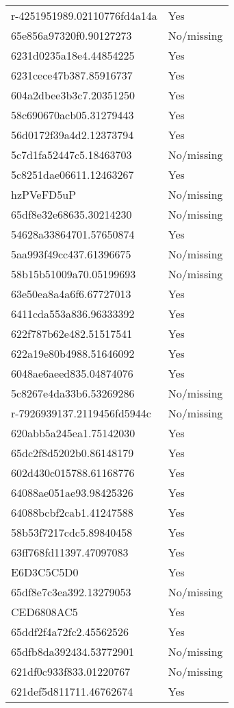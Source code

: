 \begin{tabular}{ll}
r-4251951989.02110776fd4a14a & Yes \\
65e856a97320f0.90127273 & No/missing \\
6231d0235a18e4.44854225 & Yes \\
6231cece47b387.85916737 & Yes \\
604a2dbee3b3c7.20351250 & Yes \\
58c690670acb05.31279443 & Yes \\
56d0172f39a4d2.12373794 & Yes \\
5c7d1fa52447c5.18463703 & No/missing \\
5c8251dae06611.12463267 & Yes \\
hzPVeFD5uP & No/missing \\
65df8e32e68635.30214230 & No/missing \\
54628a33864701.57650874 & Yes \\
5aa993f49cc437.61396675 & No/missing \\
58b15b51009a70.05199693 & No/missing \\
63e50ea8a4a6f6.67727013 & Yes \\
6411cda553a836.96333392 & Yes \\
622f787b62e482.51517541 & Yes \\
622a19e80b4988.51646092 & Yes \\
6048ae6aeed835.04874076 & Yes \\
5c8267e4da33b6.53269286 & No/missing \\
r-7926939137.2119456fd5944c & No/missing \\
620abb5a245ea1.75142030 & Yes \\
65dc2f8d5202b0.86148179 & Yes \\
602d430c015788.61168776 & Yes \\
64088ae051ae93.98425326 & Yes \\
64088bcbf2cab1.41247588 & Yes \\
58b53f7217cdc5.89840458 & Yes \\
63ff768fd11397.47097083 & Yes \\
E6D3C5C5D0 & Yes \\
65df8e7c3ea392.13279053 & No/missing \\
CED6808AC5 & Yes \\
65ddf2f4a72fc2.45562526 & Yes \\
65dfb8da392434.53772901 & No/missing \\
621df0c933f833.01220767 & No/missing \\
621def5d811711.46762674 & Yes \\

\end{tabular}
